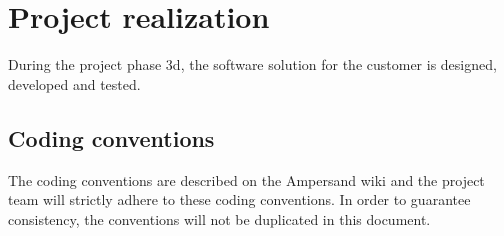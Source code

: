 \section{Project realization}
\label{sec:project-realization}
%
During the project phase 3d, the software solution for the customer is designed, developed and tested.

\subsection{Coding conventions}
\label{subsec:coding-conventions}
%
The coding conventions are described on the Ampersand wiki\cite{ampersand-wiki} and the project team will strictly adhere to these coding conventions.
In order to guarantee consistency, the conventions will not be duplicated in this document.

